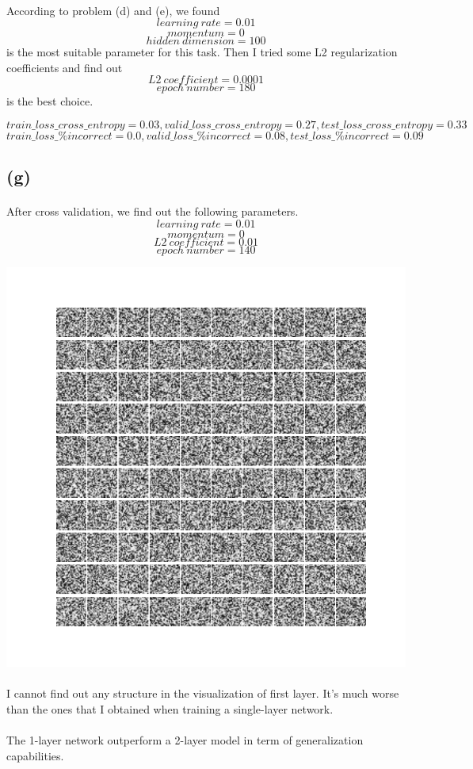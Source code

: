 \documentclass[twoside]{article}
\begin{document}
\paragraph{}According to problem (d) and (e), we found $$learning\ rate = 0.01$$ $$momentum = 0$$ $$hidden\ dimension = 100$$ is the most suitable parameter for this task. Then I tried some L2 regularization coefficients and find out $$L2\ coefficient = 0.0001$$  $$epoch\ number = 180$$is the best choice.

		$$train\_loss\_cross\_entropy =  0.03, valid\_loss\_cross\_entropy = 0.27,  test\_loss\_cross\_entropy = 0.33$$
		$$train\_loss\_\%incorrect = 0.0, valid\_loss\_\%incorrect = 0.08, test\_loss\_\%incorrect = 0.09$$

\subsection{(g)}
\paragraph{} After cross validation, we find out the following parameters.
$$learning\ rate = 0.01$$ $$momentum = 0$$
$$L2\ coefficient = 0.01$$  $$epoch\ number = 140$$

\includegraphics[width=0.5\linewidth]{images/problem_g_visualization}
\paragraph{} I cannot find out any structure in the visualization of first layer. It's much worse than the ones that I obtained when training a single-layer network.
\paragraph{} The 1-layer network outperform a 2-layer model in term of generalization capabilities.
\end{document}
